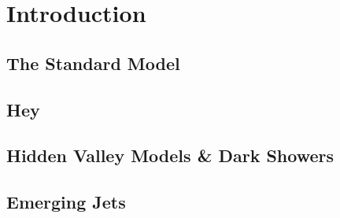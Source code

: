 

\chapter{Introduction}  

\section{The Standard Model}

\section{Hey}


\section{Hidden Valley Models \& Dark Showers}

\section{Emerging Jets}







	
